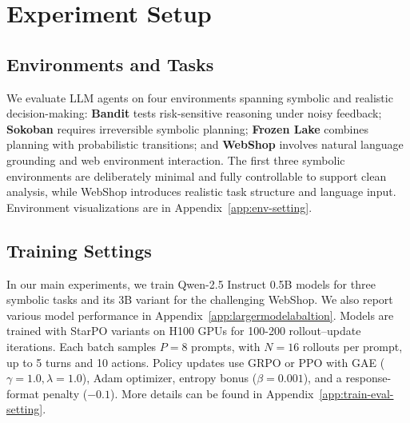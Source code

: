 \vspace{-2pt}
\section{Experiment Setup}
\label{sec:exp}
\vspace{-2pt}
\subsection{Environments and Tasks}
\label{sec:envs}

We evaluate LLM agents on four environments spanning symbolic and realistic decision-making: \textbf{Bandit} tests risk-sensitive reasoning under noisy feedback; \textbf{Sokoban} requires irreversible symbolic planning; \textbf{Frozen Lake} combines planning with probabilistic transitions; and \textbf{WebShop} involves natural language grounding and web environment interaction. 
The first three symbolic environments are deliberately minimal and fully controllable to support clean analysis, while WebShop introduces realistic task structure and language input. Environment visualizations are in Appendix~\ref{app:env-setting}.
\vspace{-5pt}

\subsection{Training Settings}
In our main experiments, we train Qwen-2.5 Instruct 0.5B models for three symbolic tasks and its 3B variant for the challenging WebShop. We also report various model performance in Appendix~\ref{app:largermodelabaltion}. Models are trained with StarPO variants on H100 GPUs for 100-200 rollout–update iterations. Each batch samples $P{=}8$ prompts, with $N{=}16$ rollouts per prompt, up to 5 turns and 10 actions. Policy updates use GRPO or PPO with GAE ($\gamma{=}1.0, \lambda{=}1.0$), Adam optimizer, entropy bonus ($\beta{=}0.001$), and a response-format penalty ($-0.1$). More details can be found in Appendix~\ref{app:train-eval-setting}.
\vspace{-5pt}

